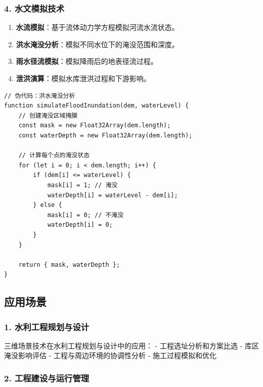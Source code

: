 \subsubsection{4.
水文模拟技术}\label{ux6c34ux6587ux6a21ux62dfux6280ux672f}

\begin{enumerate}
\def\labelenumi{\arabic{enumi}.}
\tightlist
\item
  \textbf{水流模拟}：基于流体动力学方程模拟河流水流状态。
\item
  \textbf{洪水淹没分析}：模拟不同水位下的淹没范围和深度。
\item
  \textbf{雨水径流模拟}：模拟降雨后的地表径流过程。
\item
  \textbf{泄洪演算}：模拟水库泄洪过程和下游影响。
\end{enumerate}

\begin{lstlisting}
// 伪代码：洪水淹没分析
function simulateFloodInundation(dem, waterLevel) {
    // 创建淹没区域掩膜
    const mask = new Float32Array(dem.length);
    const waterDepth = new Float32Array(dem.length);
    
    // 计算每个点的淹没状态
    for (let i = 0; i < dem.length; i++) {
        if (dem[i] <= waterLevel) {
            mask[i] = 1; // 淹没
            waterDepth[i] = waterLevel - dem[i];
        } else {
            mask[i] = 0; // 不淹没
            waterDepth[i] = 0;
        }
    }
    
    return { mask, waterDepth };
}
\end{lstlisting}

\subsection{应用场景}\label{ux5e94ux7528ux573aux666f}

\subsubsection{1.
水利工程规划与设计}\label{ux6c34ux5229ux5de5ux7a0bux89c4ux5212ux4e0eux8bbeux8ba1}

三维场景技术在水利工程规划与设计中的应用： - 工程选址分析和方案比选 -
库区淹没影响评估 - 工程与周边环境的协调性分析 - 施工过程模拟和优化

\subsubsection{2.
工程建设与运行管理}\label{ux5de5ux7a0bux5efaux8bbeux4e0eux8fd0ux884cux7ba1ux7406}

